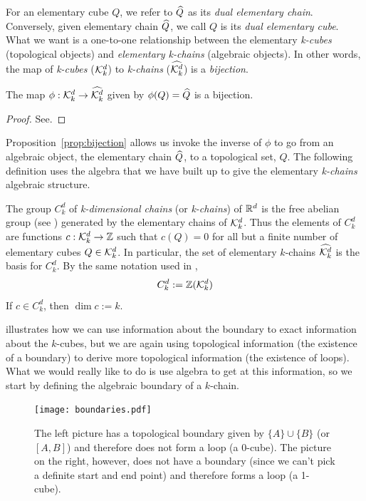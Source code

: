For an elementary cube $Q$, we refer to $\widehat{Q}$ as its \textit{dual elementary chain}. Conversely, given elementary chain $\widehat{Q}$, we call $Q$ is its \textit{dual elementary cube}. What we want is a one-to-one relationship between the elementary \textit{k-cubes} (topological objects) and \textit{elementary k-chains} (algebraic objects). In other words, the map of \textit{k-cubes} ($\mathcal{K}^{d}_k$) to \textit{k-chains} ($\widehat{\mathcal{K}^{d}_k}$) is a \textit{bijection}. 
%
\begin{prop} \label{prop:bijection}
	The map $\phi : \mathcal{K}^{d}_k \rightarrow \widehat{\mathcal{K}^{d}_k}$ given by $\phi(Q) = \widehat{Q}$ is a bijection.
\end{prop}
%
\begin{proof}
	See.
\end{proof}

Proposition~\ref{prop:bijection} allows us invoke the inverse of $\phi$ to go from an algebraic object, the elementary chain $\widehat{Q}$, to a topological set, $Q$. The following definition uses the algebra that we have built up to give the elementary \textit{k-chains} algebraic structure.
%
\begin{defn}
	The group $C_k^d$ of \textit{k-dimensional chains} (or \textit{k-chains}) of $\mathbb{R}^d$ is the free abelian group (see ) generated by the elementary chains of $\mathcal{K}^{d}_k$. Thus the elements of $C_k^d$ are functions $c : \mathcal{K}^{d}_k \rightarrow \mathbb{Z}$ such that $c(Q) = 0$ for all but a finite number of elementary cubes $Q \in \mathcal{K}^{d}_k$. In particular, the set of elementary $k$-chains $\widehat{\mathcal{K}^{d}_k}$ is the basis for $C_k^d$. By the same notation used in ,
	$$ C_k^d := \mathbb{Z}(\mathcal{K}^{d}_k) $$
	If $ c \in C_k^d$, then $\dim c := k$.
\end{defn}

 illustrates how we can use information about the boundary to exact information about the $k$-cubes, but we are again using topological information (the existence of a boundary) to derive more topological information (the existence of loops). What we would really like to do is use algebra to get at this information, so we start by defining the algebraic boundary of a $k$-chain.
%
\begin{figure}[h]
	\begin{center}
	\texttt{[image: boundaries.pdf]}
	\caption{\label{fig:boundaries} The left picture has a topological boundary given by $\{ A \} \cup \{ B \}$ (or $[A, B]$) and therefore does not form a loop (a 0-cube). The picture on the right, however, does not have a boundary (since we can't pick a definite start and end point) and therefore forms a loop (a 1-cube).}
	\end{center}
\end{figure}

